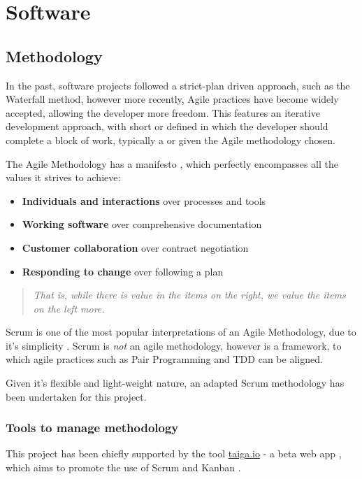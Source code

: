 \section{Software}

\subsection{Methodology}

In the past, software projects followed a strict-plan driven approach, such as the Waterfall method, however more recently, Agile practices have become widely accepted, allowing the developer more freedom. This features an iterative development approach, with short  or  defined in which the developer should complete a block of work, typically a  or  given the Agile methodology chosen.

The Agile Methodology has a manifesto \cite{Manifesto}, which perfectly encompasses all the values it strives to achieve:
\begin{itemize}
  \item \textbf{Individuals and interactions} over processes and tools
  \item \textbf{Working software} over comprehensive documentation
  \item \textbf{Customer collaboration} over contract negotiation
  \item \textbf{Responding to change} over following a plan
\end{itemize}

\begin{quotation}
  \textit{That is, while there is value in the items on the right, we value the items on the left more.}
\end{quotation}

Scrum is one of the most popular interpretations of an Agile Methodology, due to it's simplicity \cite{scrum}. Scrum is \textit{not} an agile methodology, however is a framework, to which agile practices such as Pair Programming and \acrfull{TDD} can be aligned.

Given it's flexible and light-weight nature, an adapted Scrum methodology has been undertaken for this project.


\subsubsection{Tools to manage methodology}

This project has been chiefly supported by the tool \url{taiga.io} - a beta web app \cite{Taiga.io}, which aims to promote the use of Scrum and Kanban \cite{kanban}.

